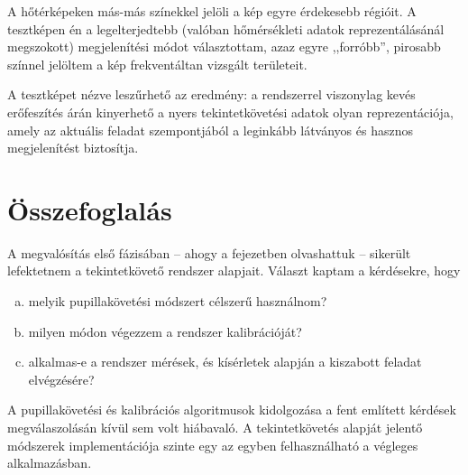 A hőtérképeken más-más színekkel jelöli a kép egyre érdekesebb régióit. A tesztképen én a legelterjedtebb (valóban hőmérsékleti adatok reprezentálásánál megszokott) megjelenítési módot választottam, azaz egyre ,,forróbb'', pirosabb színnel jelöltem a kép frekventáltan vizsgált területeit.

\bigskip

A tesztképet nézve leszűrhető az eredmény: a rendszerrel viszonylag kevés erőfeszítés árán kinyerhető a nyers tekintetkövetési adatok olyan reprezentációja, amely az aktuális feladat szempontjából a leginkább látványos és hasznos megjelenítést biztosítja.

\section{Összefoglalás}\label{sect:kiserlet_osszefoglalas}

A megvalósítás első fázisában -- ahogy a fejezetben olvashattuk -- sikerült lefektetnem a tekintetkövető rendszer alapjait. Választ kaptam a kérdésekre, hogy

\begin{enumerate}[a)]
 \item melyik pupillakövetési módszert célszerű használnom?
 \item milyen módon végezzem a rendszer kalibrációját?
 \item alkalmas-e a rendszer mérések, és kísérletek alapján a kiszabott feladat elvégzésére?
\end{enumerate} 

A pupillakövetési és kalibrációs algoritmusok kidolgozása a fent említett kérdések megválaszolásán kívül sem volt hiábavaló. A tekintetkövetés alapját jelentő módszerek implementációja szinte egy az egyben felhasználható a végleges alkalmazásban.